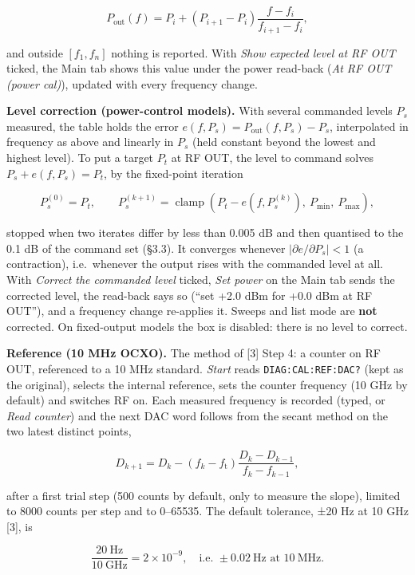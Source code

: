 \documentclass[
\directlua{luaotfload.add_fallback("qsfallback", {"DejaVu Sans:mode=harf;", "DejaVu Sans Mono:mode=harf;", "DejaVu Math TeX Gyre:mode=harf;"})}
  10pt,
  letterpaper,
]{article}
\begin{document}
\[
P_\mathrm{out}(f) = P_i + \left(P_{i+1} - P_i\right)\frac{f - f_i}{f_{i+1} - f_i},
\]

and outside \([f_1, f_n]\) nothing is reported. With \emph{Show expected
level at RF OUT} ticked, the Main tab shows this value under the power
read-back (\emph{At RF OUT (power cal)}), updated with every frequency
change.

\textbf{Level correction (power-control models).} With several commanded
levels \(P_s\) measured, the table holds the error
\(e(f, P_s) = P_\mathrm{out}(f, P_s) - P_s\), interpolated in frequency
as above and linearly in \(P_s\) (held constant beyond the lowest and
highest level). To put a target \(P_t\) at RF OUT, the level to command
solves \(P_s + e(f, P_s) = P_t\), by the fixed-point iteration

\[
P_s^{(0)} = P_t, \qquad
P_s^{(k+1)} = \operatorname{clamp}\!\left(P_t - e\!\left(f, P_s^{(k)}\right),\ P_\mathrm{min},\ P_\mathrm{max}\right),
\]

stopped when two iterates differ by less than 0.005 dB and then
quantised to the 0.1 dB of the command set (§3.3). It converges whenever
\(\lvert\partial e/\partial P_s\rvert < 1\) (a contraction),
i.e.~whenever the output rises with the commanded level at all. With
\emph{Correct the commanded level} ticked, \emph{Set power} on the Main
tab sends the corrected level, the read-back says so (``set +2.0 dBm for
+0.0 dBm at RF OUT''), and a frequency change re-applies it. Sweeps and
list mode are \textbf{not} corrected. On fixed-output models the box is
disabled: there is no level to correct.

\textbf{Reference (10 MHz OCXO).} The method of {[}3{]} Step 4: a
counter on RF OUT, referenced to a 10 MHz standard. \emph{Start} reads
\texttt{DIAG:CAL:REF:DAC?} (kept as the original), selects the internal
reference, sets the counter frequency (10 GHz by default) and switches
RF on. Each measured frequency is recorded (typed, or \emph{Read
counter}) and the next DAC word follows from the secant method on the
two latest distinct points,

\[
D_{k+1} = D_k - \left(f_k - f_\mathrm{t}\right)\frac{D_k - D_{k-1}}{f_k - f_{k-1}},
\]

after a first trial step (500 counts by default, only to measure the
slope), limited to 8000 counts per step and to 0--65535. The default
tolerance, ±20 Hz at 10 GHz {[}3{]}, is

\[
\frac{20\ \mathrm{Hz}}{10\ \mathrm{GHz}} = 2\times10^{-9},
\quad\text{i.e. } \pm 0.02\ \mathrm{Hz} \text{ at } 10\ \mathrm{MHz}.
\]
\end{document}
